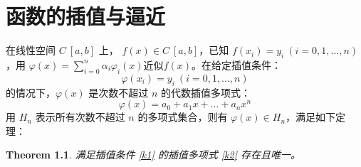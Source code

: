 




% 



\chapter{函数的插值与逼近}
	在线性空间 $C\ [a,b]$ 上， $f(x)\in C\  [a,b]$，已知 $f(x_i)=y_i\ (i=0,1,\dots ,n)$，用 $\displaystyle{\varphi (x) = \sum_{i=0}^n \alpha_i \varphi_i(x)}$近似$f(x)$。在给定插值条件：
	\begin{equation}
	\varphi(x_i)=y_i\ (i=0,1,\dots,n) \label{k1}
	\end{equation}
	的情况下，$\varphi(x)$ 是次数不超过 $n$ 的代数插值多项式：
	\begin{equation}
	\varphi(x) = a_0 + a_1 x + \dots + a_n x^n \label{k2}
	\end{equation}
	用 $H_n$ 表示所有次数不超过 $n$ 的多项式集合，则有 $\varphi (x) \in H_n$，满足如下定理：
	\newtheorem{theorem}{Theorem}[chapter]
		\begin{theorem}
		满足插值条件 \ref{k1} 的插值多项式 \ref{k2} 存在且唯一。
		\end{theorem}

